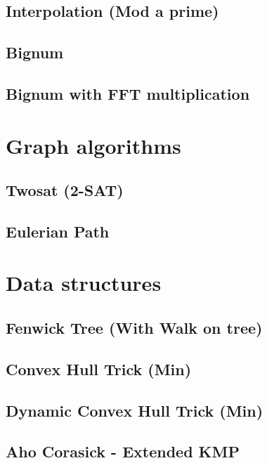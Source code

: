 \subsection{Interpolation (Mod a prime)}
\raggedbottom
\hrulefill
\subsection{Bignum}
\raggedbottom
\hrulefill
\subsection{Bignum with FFT multiplication}
\raggedbottom
\hrulefill

\section{Graph algorithms}
\subsection{Twosat (2-SAT)}
\raggedbottom
\hrulefill
\subsection{Eulerian Path}
\raggedbottom
\hrulefill

\section{Data structures}
\subsection{Fenwick Tree (With Walk on tree)}
\raggedbottom
\hrulefill
\subsection{Convex Hull Trick (Min)}
\raggedbottom
\hrulefill
\subsection{Dynamic Convex Hull Trick (Min)}
\raggedbottom
\hrulefill
\subsection{Aho Corasick - Extended KMP}
\raggedbottom
\hrulefill
